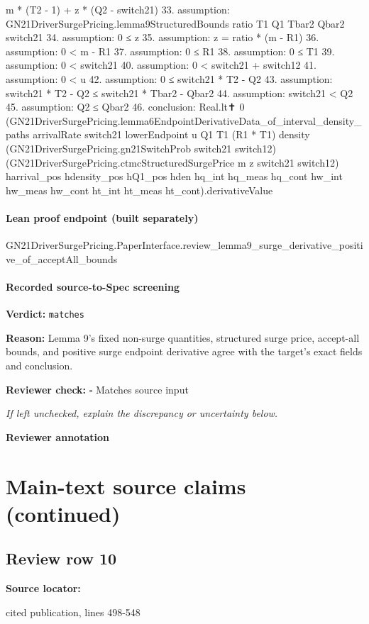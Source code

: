 \documentclass[10pt]{article}
\newcommand{\reviewerbox}{%
  \par\noindent\fbox{\parbox{0.96\linewidth}{\rule{0pt}{0.38in}}}\par
}
\newcommand{\reviewmatch}[1]{%
  \par\noindent\textbf{Reviewer check:} $\square$\; #1\par
  \noindent\emph{If left unchecked, explain the discrepancy or uncertainty below.}\par
}
\begin{document}
\begin{ReviewVerbatim}
  m * (T2 - 1) + z * (Q2 - switch21)
33. assumption: GN21DriverSurgePricing.lemma9StructuredBounds ratio T1 Q1 Tbar2 Qbar2 switch21
34. assumption: 0 ≤ z
35. assumption: z = ratio * (m - R1)
36. assumption: 0 < m - R1
37. assumption: 0 ≤ R1
38. assumption: 0 ≤ T1
39. assumption: 0 < switch21
40. assumption: 0 < switch21 + switch12
41. assumption: 0 < u
42. assumption: 0 ≤ switch21 * T2 - Q2
43. assumption: switch21 * T2 - Q2 ≤ switch21 * Tbar2 - Qbar2
44. assumption: switch21 < Q2
45. assumption: Q2 ≤ Qbar2
46. conclusion: Real.lt✝ 0
  (GN21DriverSurgePricing.lemma6EndpointDerivativeData_of_interval_density_paths arrivalRate switch21 lowerEndpoint u Q1
      T1 (R1 * T1) density (GN21DriverSurgePricing.gn21SwitchProb switch21 switch12)
      (GN21DriverSurgePricing.ctmcStructuredSurgePrice m z switch21 switch12) harrival_pos hdensity_pos hQ1_pos hden
      hq_int hq_meas hq_cont hw_int hw_meas hw_cont ht_int ht_meas ht_cont).derivativeValue
\end{ReviewVerbatim}

\paragraph{Lean proof endpoint (built separately)}\begin{ReviewVerbatim}
GN21DriverSurgePricing.PaperInterface.review_lemma9_surge_derivative_positive_of_acceptAll_bounds
\end{ReviewVerbatim}

\paragraph{Recorded source-to-Spec screening}
\textbf{Verdict:} \texttt{matches}
\\
{\raggedright
\textbf{Reason:} Lemma 9's fixed non-\allowbreak{}surge quantities, structured surge price, accept-\allowbreak{}all bounds, and positive surge endpoint derivative agree with the target's exact fields and conclusion.\allowbreak{}
\par}
\reviewmatch{Matches source input}
\noindent\textbf{Reviewer annotation}\par
\reviewerbox
\clearpage
\hypertarget{source-claim-a66252366d7621fe}{}
\hypertarget{source-section-c08c7eca66416a2f}{}
\section*{Main-text source claims (continued)}
\subsection*{Review row 10}
\textbf{Source locator:} {\footnotesize\raggedright cited publication, lines 498-\allowbreak{}548\par}
\end{document}
